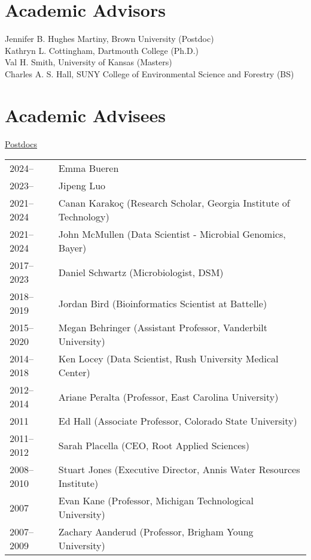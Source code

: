 \documentclass[11pt]{article}
\begin{document}
\section*{Academic Advisors}
\vspace{-0.5em}
\noindent Jennifer B. Hughes Martiny, Brown University (Postdoc)\\[0.5em]
\noindent Kathryn L. Cottingham, Dartmouth College (Ph.D.)\\[0.5em]
\noindent Val H. Smith, University of Kansas (Masters)\\[0.5em]
\noindent Charles A. S. Hall, SUNY College of Environmental Science and Forestry (BS)\\

\section*{Academic Advisees}
\vspace{-0.5em}

\textnormal{\underline{Postdocs}}\\[-2.5em]
\begin{longtable}{@{}p{4em}@{\hspace{2em}}p{}@{}}
2024--     & Emma Bueren \\
2023--     & Jipeng Luo \\
2021--2024 & Canan Karakoç (Research Scholar, Georgia Institute of Technology)\\
2021--2024 & John McMullen (Data Scientist - Microbial Genomics, Bayer)\\
2017--2023 & Daniel Schwartz (Microbiologist, DSM) \\
2018--2019 & Jordan Bird (Bioinformatics Scientist at Battelle) \\
2015--2020 & Megan Behringer (Assistant Professor, Vanderbilt University) \\
2014--2018 & Ken Locey (Data Scientist, Rush University Medical Center) \\
2012--2014 & Ariane Peralta (Professor, East Carolina University) \\
2011       & Ed Hall (Associate Professor, Colorado State University) \\
2011--2012 & Sarah Placella (CEO, Root Applied Sciences) \\
2008--2010 & Stuart Jones (Executive Director, Annis Water Resources Institute) \\
2007       & Evan Kane (Professor, Michigan Technological University) \\
2007--2009 & Zachary Aanderud (Professor, Brigham Young University) \\
\end{longtable}
\end{document}
